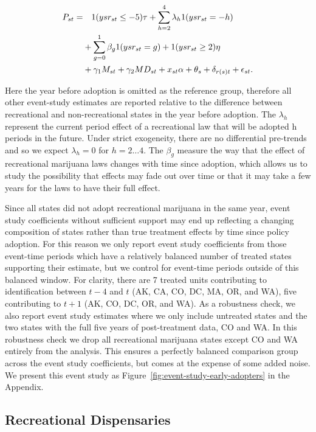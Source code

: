 \documentclass[12pt]{article}%
\begin{document}
\begin{align}
P_{st} = &~~~1(ysr_{st} \leq -5) \tau + \sum_{h=2}^{4} \lambda_h 1(ysr_{st}=-h) \notag \\ 
&+\sum_{g=0}^1\beta_g 1(ysr_{st}=g) + 1(ysr_{st} \geq 2) \eta  \notag \\ 
&+ \gamma_1 M_{st}+
\gamma_2 MD_{st}+x_{st} \alpha+\theta_s+\delta_{r(s)t}+\epsilon_{st}. \label{eq:event_study}
\end{align}

Here the year before adoption is omitted as the reference group, therefore all other event-study estimates are reported relative to the difference between recreational and non-recreational states in the year before adoption. The $\lambda_h$ represent the current period effect of a recreational law that will be adopted h periods in the future. Under strict exogeneity, there are no differential pre-trends and so we expect $\lambda_h=0$ for $h=2\ldots4$.  The $\beta_g$ measure the way that the effect of recreational marijuana laws changes with time since adoption, which allows us to study the possibility that effects may fade out over time or that it may take a few years for the laws to have their full effect.

Since all states did not adopt recreational marijuana in the same year, event study coefficients without sufficient support may end up reflecting a changing composition of states rather than true treatment effects by time since policy adoption. For this reason we only report event study coefficients from those event-time periods which have a relatively balanced number of treated states supporting their estimate, but we control for event-time periods outside of this balanced window. For clarity, there are 7 treated units contributing to identification between $t-4$ and $t$ (AK, CA, CO, DC, MA, OR, and WA), five contributing to $t+1$ (AK, CO, DC, OR, and WA). As a robustness check, we also report event study estimates where we only include untreated states and the two states with the full five years of post-treatment data, CO and WA. In this robustness check we drop all recreational marijuana states except CO and WA entirely from the analysis. This ensures a perfectly balanced comparison group across the event study coefficients, but comes at the expense of some added noise. 
We present this event study as Figure~\ref{fig:event-study-early-adopters} in the Appendix. 

\subsection{Recreational Dispensaries}
\label{sec:research_design_disp}
\end{document}
